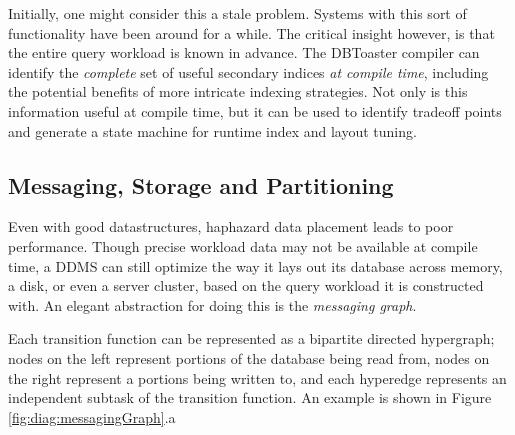 
Initially, one might consider this a stale problem.  Systems with this sort of functionality\cite{berkeleydb} have been around for a while.  The critical insight however, is that the entire query workload is known in advance.  The DBToaster compiler can identify the \textit{complete} set of useful secondary indices \textit{at compile time}, including the potential benefits of more intricate indexing strategies.  Not only is this information useful at compile time, but it can be used to identify tradeoff points and generate a state machine for runtime index and layout tuning.


\subsection{Messaging, Storage and Partitioning}
Even with good datastructures, haphazard data placement leads to poor performance.  Though precise workload data may not be available at compile time, a DDMS can still optimize the way it lays out its database across memory, a disk, or even a server cluster, based on the query workload it is constructed with.  An elegant abstraction for doing this is the \textit{messaging graph}.

Each transition function can be represented as a bipartite directed hypergraph; nodes on the left represent portions of the database being read from, nodes on the right represent a portions being written to, and each hyperedge represents an independent subtask of the transition function.  An example is shown in Figure \ref{fig:diag:messagingGraph}.a

